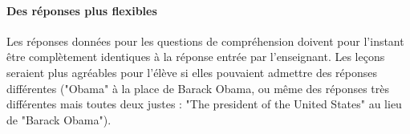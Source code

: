 \paragraph{Des réponses plus flexibles}
Les réponses données pour les questions de compréhension doivent pour l'instant être complètement identiques à la réponse entrée par l'enseignant. Les leçons seraient plus agréables pour l'élève si elles pouvaient admettre des réponses différentes ("Obama" à la place de Barack Obama, ou même des réponses très différentes mais toutes deux justes : "The president of the United States" au lieu de "Barack Obama").
